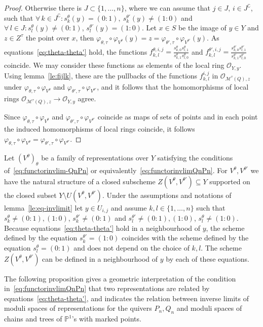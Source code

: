\documentclass[ALCO,ThmDefs,Unicode,epreuves]{cedram}
\def\phi{\varphi}
\def\P{\mathds P}
\def\O{\mathcal O}
\begin{document}
\begin{proof}
Otherwise there is $J\subset\{1,\ldots,n\}$, where we can assume that $j\in J$,
$i\in J^\complement$, such that 
$\forall\,k\in J^\complement\colon s^\theta_k(y)=(0:1),\:s^{\theta'}_k(y)\neq(1:0)$ 
and $\forall\,l\in J\colon s^\theta_l(y)\neq (0:1)$, $s^{\theta'}_l(y)=(1:0)$.
Let $x\in S$ be the image of $y\in Y$ and $z\in Z^\tau$ the point over $x$, then 
$\phi_{\theta,\tau}\circ\phi_{V^\theta}(y)=z=\phi_{\theta',\tau}
\circ\phi_{V^{\theta'}}(y)$.
As equations~\eqref{eq:theta-theta'} hold, the functions
$f^{\theta,i,j}_{k,l}=\frac{s^\theta_{k,0}s^\theta_{l,1}}{s^\theta_{k,1}s^\theta_{l,0}}$ 
and $f^{\theta'\!,i,j}_{k,l}=\frac{s^{\theta'}_{k,0}s^{\theta'}_{l,1}}
{s^{\theta'}_{k,1}s^{\theta'}_{l,0}}$ coincide. We may consider these functions 
as elements of the local ring $\O_{Y,y}$.
Using lemma~\ref{le:fijlk}, these are the pullbacks of the functions $f^{i,j}_{k,l}$ 
in $\O_{\mathcal M^\tau(Q),z}$ under $\phi_{\theta,\tau}\circ\phi_{V^\theta}$ and
$\phi_{\theta',\tau}\circ\phi_{V^{\theta'}}$, and it follows that the homomorphisms 
of local rings $\O_{\mathcal M^\tau(Q),z}\to\O_{Y,y}$ agree.

Since $\phi_{\theta,\tau}\circ\phi_{V^\theta}$ and 
$\phi_{\theta',\tau}\circ\phi_{V^{\theta'}}$ coincide as maps of sets of points and 
in each point the induced homomorphisms of local rings coincide, it follows
$\phi_{\theta,\tau}\circ\phi_{V^\theta}=\phi_{\theta',\tau}\circ\phi_{V^{\theta'}}$.
\end{proof}

Let $(V^\theta)_\theta$ be a family of representations over $Y$ satisfying the 
conditions of~\eqref{eq:functorinvlim-QnPn} or equivalently~\eqref{eq:functorinvlimQnPn}. 
For $V^\theta, V^{\theta'}$ we have the natural structure of a closed subscheme 
$Z(V^\theta,V^{\theta'})\subseteq Y$ supported on the closed subset 
$Y\setminus U(V^\theta,V^{\theta'})$. 
Under the assumptions and notations of lemma~\ref{le:eq-invlimit}
let $y\in U_{i,j}$ and assume $k,l\in\{1,\ldots,n\}$ such that
$s^\theta_k\neq(0:1),(1:0)$, $s^{\theta'}_k\neq(0:1)$
and $s^{\theta'}_l\neq(0:1),(1:0)$, $s^\theta_l\neq(1:0)$.
Because equations~\eqref{eq:theta-theta'} hold in a neighbourhood of $y$, the 
scheme defined by the equation $s^{\theta'}_k=(1:0)$ coincides with the scheme 
defined by the equation $s^\theta_l=(0:1)$ and does not depend on the choice 
of $k,l$.
The scheme $Z(V^\theta,V^{\theta'})$ can be defined in a neighbourhood of $y$
by each of these equations.


The following proposition gives a geometric interpretation of the
condition in~\eqref{eq:functorinvlimQnPn} that two representations 
are related by equations~\eqref{eq:theta-theta'}, 
and indicates the relation between inverse limits 
of moduli spaces of representations for the quivers $P_n,Q_n$ and
moduli spaces of chains and trees of $\P^1$'s with marked points.
\end{document}
